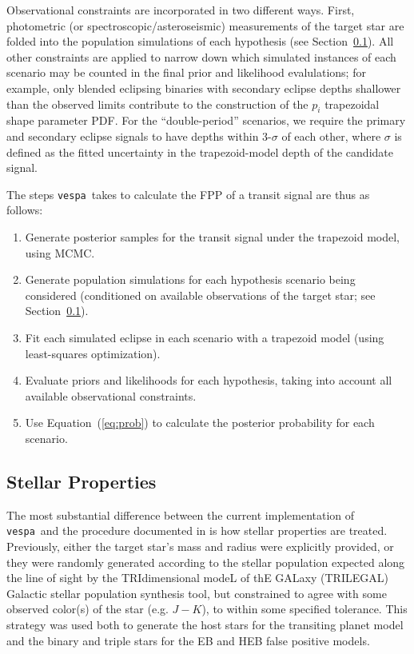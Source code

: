 \documentclass{emulateapj}
\newcommand{\Eq}[1]{Equation~(\ref{eq:#1})}
\newcommand{\eq}[1]{\Eq{#1}}
\newcommand{\sectionname}{Section}
\newcommand{\Sect}[1]{\sectionname~\ref{sect:#1}}
\newcommand{\sect}[1]{\Sect{#1}}
\newcommand{\sectlabel}[1]{\label{sect:#1}}
\newcommand{\vespa}{\texttt{vespa}}
\begin{document}
Observational constraints are incorporated in two different ways.
First, photometric (or spectroscopic/asteroseismic) measurements of
the target star are folded into the population simulations of each
hypothesis (see \sect{methods:stellar}).  All other constraints are
applied to narrow down which simulated instances of each scenario may
be counted in the final prior and likelihood evalulations; for
example, only blended eclipsing binaries with secondary eclipse depths
shallower than the observed limits contribute to the construction of
the $p_i$ trapezoidal shape parameter PDF.  For the ``double-period''
scenarios, we require the primary and secondary eclipse signals to
have depths within 3-$\sigma$ of each other, where $\sigma$ is defined
as the fitted uncertainty in the trapezoid-model depth of the
candidate signal.

The steps \vespa\ takes to calculate the FPP of a transit signal
are thus as follows:
\begin{enumerate}
\item Generate posterior samples for the transit signal under the
  trapezoid model, using MCMC.
\item Generate population simulations for each hypothesis scenario
  being considered (conditioned on available observations of the
  target star; see \sect{methods:stellar}).
\item Fit each simulated eclipse in each scenario with a trapezoid
  model (using least-squares optimization).
\item Evaluate priors and likelihoods for each hypothesis, taking into
  account all available observational constraints.
\item Use \eq{prob} to calculate the posterior probability for each scenario.
\end{enumerate}


\subsection{Stellar Properties}
\sectlabel{methods:stellar}

The most substantial difference between the current implementation of
\vespa\ and the procedure documented in  is
how stellar properties are treated.  Previously, either the target
star's mass and radius were explicitly provided, or they were randomly
generated according to the stellar population expected along the line
of sight by the TRIdimensional modeL of thE GALaxy (TRILEGAL) Galactic
stellar population synthesis tool, but constrained to agree with some
observed color(s) of the star (e.g. $J-K$), to within some specified
tolerance.  This strategy was used both to generate the host stars for
the transiting planet model and the binary and triple stars for the EB
and HEB false positive models.
\end{document}
